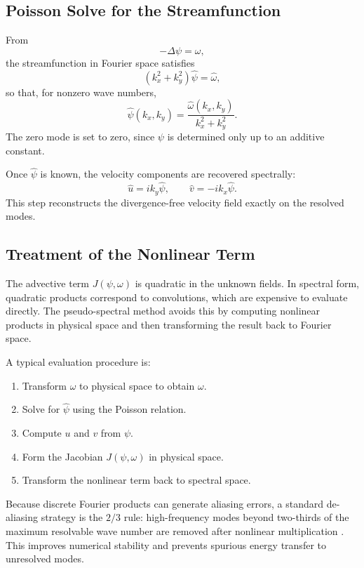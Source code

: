 \documentclass[11pt]{article}
\begin{document}
\subsection{Poisson Solve for the Streamfunction}

From
\[
-\Delta \psi = \omega,
\]
the streamfunction in Fourier space satisfies
\[
(k_x^2 + k_y^2)\widehat{\psi} = \widehat{\omega},
\]
so that, for nonzero wave numbers,
\[
\widehat{\psi}(k_x,k_y) = \frac{\widehat{\omega}(k_x,k_y)}{k_x^2+k_y^2}.
\]
The zero mode is set to zero, since $\psi$ is determined only up to an additive constant.

Once $\widehat{\psi}$ is known, the velocity components are recovered spectrally:
\[
\widehat{u} = i k_y \widehat{\psi}, \qquad
\widehat{v} = -i k_x \widehat{\psi}.
\]
This step reconstructs the divergence-free velocity field exactly on the resolved modes.

\subsection{Treatment of the Nonlinear Term}

The advective term $J(\psi,\omega)$ is quadratic in the unknown fields. In spectral form, quadratic products correspond to convolutions, which are expensive to evaluate directly. The pseudo-spectral method avoids this by computing nonlinear products in physical space and then transforming the result back to Fourier space.

A typical evaluation procedure is:
\begin{enumerate}[label=\arabic*.]
    \item Transform $\widehat{\omega}$ to physical space to obtain $\omega$.
    \item Solve for $\widehat{\psi}$ using the Poisson relation.
    \item Compute $u$ and $v$ from $\psi$.
    \item Form the Jacobian $J(\psi,\omega)$ in physical space.
    \item Transform the nonlinear term back to spectral space.
\end{enumerate}

Because discrete Fourier products can generate aliasing errors, a standard de-aliasing strategy is the $2/3$ rule: high-frequency modes beyond two-thirds of the maximum resolvable wave number are removed after nonlinear multiplication \cite{canuto2006, boyd2001}. This improves numerical stability and prevents spurious energy transfer to unresolved modes.
\end{document}
